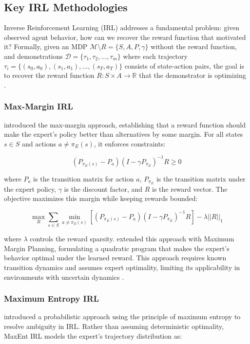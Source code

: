 \subsection{Key IRL Methodologies}

Inverse Reinforcement Learning (IRL) addresses a fundamental problem: given observed agent behavior, how can we recover the reward function that motivated it? Formally, given an MDP $\mathcal{M} \setminus R = \{S, A, P, \gamma\}$ without the reward function, and demonstrations $\mathcal{D} = \{\tau_1, \tau_2, ..., \tau_m\}$ where each trajectory $\tau_i = \{(s_0, a_0), (s_1, a_1), ..., (s_T, a_T)\}$ consists of state-action pairs, the goal is to recover the reward function $R: S \times A \rightarrow \mathbb{R}$ that the demonstrator is optimizing \citep{NgRussell2000}.

\subsubsection{Max-Margin IRL}

\citet{NgRussell2000} introduced the max-margin approach, establishing that a reward function should make the expert's policy better than alternatives by some margin. For all states $s \in S$ and actions $a \neq \pi_E(s)$, it enforces constraints:

$$(P_{\pi_E(s)} - P_a)(I - \gamma P_{\pi_E})^{-1}R \geq 0$$

\noindent where $P_a$ is the transition matrix for action $a$, $P_{\pi_E}$ is the transition matrix under the expert policy, $\gamma$ is the discount factor, and $R$ is the reward vector. The objective maximizes this margin while keeping rewards bounded:

$$\max_R \sum_{s\in S} \min_{a\neq\pi_E(s)} [(P_{\pi_E(s)} - P_a)(I - \gamma P_{\pi_E})^{-1}R] - \lambda||R||_1$$

\noindent where $\lambda$ controls the reward sparsity. \citet{Ratliff2006} extended this approach with Maximum Margin Planning, formulating a quadratic program that makes the expert's behavior optimal under the learned reward. This approach requires known transition dynamics and assumes expert optimality, limiting its applicability in environments with uncertain dynamics \citep{Abbeel2004}.

\subsubsection{Maximum Entropy IRL}

\citet{Ziebart2008} introduced a probabilistic approach using the principle of maximum entropy to resolve ambiguity in IRL. Rather than assuming deterministic optimality, MaxEnt IRL models the expert's trajectory distribution as:

